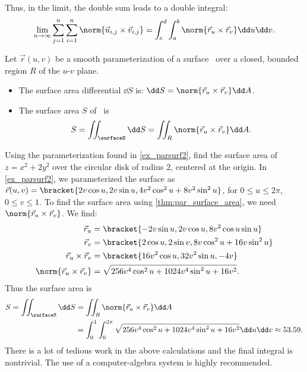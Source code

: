 Thus, in the limit, the double sum leads to a double integral:
\[
\lim_{n\to\infty} \sum_{j=1}^n\sum_{i=1}^n \norm{\vec u_{i,j}\times \vec v_{i,j}}
= \int_c^d\int_a^b \norm{\vec r_u\times\vec r_v}\dd u\dd v.
\]

\begin{theorem}\label{thm:par_surface_area}
Let $\vec r(u,v)$ be a smooth parameterization of a surface \surfaceS\ over a closed, bounded region $R$ of the $u$-$v$ plane. 
\begin{itemize}
\item	The surface area differential $\dd S$ is: $\dd S = \norm{\vec r_u\times \vec r_v}\dd A$.
\item The surface area $S$ of \surfaceS\ is
\[S = \iint_{\surfaceS}\dd S = \iint_R \norm{\vec r_u\times \vec r_v}\dd A.\]
\end{itemize}
\end{theorem}


\begin{example}\label{ex_parsurfarea1}
Using the parameterization found in \autoref{ex_parsurf2}, find the surface area of $z=x^2+2y^2$ over the circular disk of radius 2, centered at the origin.
\solution
In \autoref{ex_parsurf2}, we parameterized the surface as $\vec r(u,v) =\\ \bracket{2v\cos u, 2v\sin u, 4v^2\cos^2u+8v^2\sin^2u}$, for $0\leq u\leq 2\pi$, $0\leq v\leq 1$. To find the surface area using \autoref{thm:par_surface_area}, we need $\norm{\vec r_u\times\vec r_v}$. We find:
\begin{align*}
\vec r_u &= \bracket{-2v\sin u, 2v\cos u, 8v^2\cos u\sin u}\\
\vec r_v &= \bracket{2\cos u, 2\sin v, 8v\cos^2 u+16v\sin^2u}\\
\vec r_u\times\vec r_v &= \bracket{16v^2\cos u, 32v^2\sin u, -4v}\\
\norm{\vec r_u\times\vec r_v} &= \sqrt{256v^4\cos^2u+1024v^4\sin^2u+16v^2}.
\end{align*}
Thus the surface area is
\begin{align*}
S = \iint_{\surfaceS} \dd S &= \iint_R\norm{\vec r_u\times \vec r_v}\dd A \\
& = \int_0^1\int_0^{2\pi} \sqrt{256v^4\cos^2u+1024v^4\sin^2u+16v^2}\dd u\dd v \approx 53.59.
\end{align*}
There is a lot of tedious work in the above calculations and the final integral is nontrivial. The use of a computer-algebra system is highly recommended.
\end{example}

